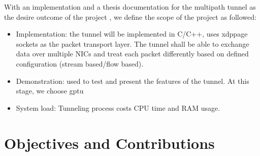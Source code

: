 With an implementation and a thesis documentation for the multipath tunnel as the desire outcome of the project , we define the scope of the project as followed:
\begin{itemize}
    \item Implementation: the tunnel will be implemented in C/C++, uses \ac{xdppage} sockets as the packet transport layer. The tunnel shall be able to exchange data over multiple \ac{NIC}s and treat each packet differently based on defined configuration (stream based/flow based). 
    \item Demonstration: used to test and present the features of the tunnel. At this stage, we choose \ac{gptu} 
    \item System load: Tunneling process costs CPU time and RAM usage.
\end{itemize}





\section{Objectives and Contributions}





